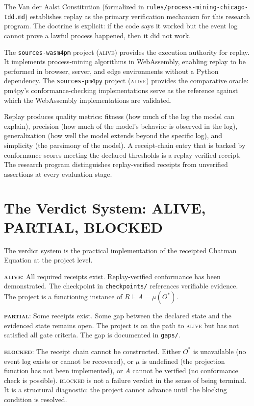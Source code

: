 The Van der Aalst Constitution (formalized in \texttt{rules/process-mining-chicago-tdd.md}) establishes replay as the primary verification mechanism for this research program. The doctrine is explicit: if the code says it worked but the event log cannot prove a lawful process happened, then it did not work.

The \texttt{sources-wasm4pm} project (\textsc{alive}) provides the execution authority for replay. It implements process-mining algorithms in WebAssembly, enabling replay to be performed in browser, server, and edge environments without a Python dependency. The \texttt{sources-pm4py} project (\textsc{alive}) provides the comparative oracle: pm4py's conformance-checking implementations serve as the reference against which the WebAssembly implementations are validated.

Replay produces quality metrics: fitness (how much of the log the model can explain), precision (how much of the model's behavior is observed in the log), generalization (how well the model extends beyond the specific log), and simplicity (the parsimony of the model). A receipt-chain entry that is backed by conformance scores meeting the declared thresholds is a replay-verified receipt. The research program distinguishes replay-verified receipts from unverified assertions at every evaluation stage.

\section{The Verdict System: ALIVE, PARTIAL, BLOCKED}

The verdict system is the practical implementation of the receipted Chatman Equation at the project level.

\textbf{\textsc{alive}}: All required receipts exist. Replay-verified conformance has been demonstrated. The checkpoint in \texttt{checkpoints/} references verifiable evidence. The project is a functioning instance of $R \vdash A = \mu(O^{*})$.

\textbf{\textsc{partial}}: Some receipts exist. Some gap between the declared state and the evidenced state remains open. The project is on the path to \textsc{alive} but has not satisfied all gate criteria. The gap is documented in \texttt{gaps/}.

\textbf{\textsc{blocked}}: The receipt chain cannot be constructed. Either $O^{*}$ is unavailable (no event log exists or cannot be recovered), or $\mu$ is undefined (the projection function has not been implemented), or $A$ cannot be verified (no conformance check is possible). \textsc{blocked} is not a failure verdict in the sense of being terminal. It is a structural diagnostic: the project cannot advance until the blocking condition is resolved.

